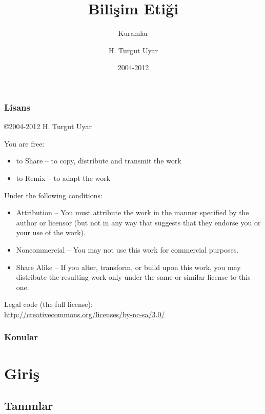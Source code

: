 \documentclass[dvipsnames]{beamer}
\title{Bilişim Etiği}
\subtitle{Kuramlar}
\author{H. Turgut Uyar}
\date{2004-2012}
\theoremstyle{definition}
\theoremstyle{example}
\theoremstyle{plain}
\begin{document}
\begin{frame}
  \titlepage
\end{frame}

\begin{frame}
  \frametitle{Lisans}

  \hfill
  \copyright 2004-2012 H. Turgut Uyar

  \vfill
  \begin{tiny}
    You are free:
    \begin{itemize}
      \item to Share -- to copy, distribute and transmit the work
      \item to Remix -- to adapt the work
    \end{itemize}

    Under the following conditions:
    \begin{itemize}
      \item Attribution -- You must attribute the work in the manner specified by
        the author or licensor (but not in any way that suggests that they
        endorse you or your use of the work).

      \item Noncommercial -- You may not use this work for commercial purposes.

      \item Share Alike -- If you alter, transform, or build upon this work, you
        may distribute the resulting work only under the same or similar license
        to this one.
    \end{itemize}
  \end{tiny}

  \vfill
  Legal code (the full license):\\
  \url{http://creativecommons.org/licenses/by-nc-sa/3.0/}
\end{frame}

\begin{frame}
  \frametitle{Konular}
  \tableofcontents
\end{frame}

\section{Giriş}

\subsection{Tanımlar}
\end{document}
